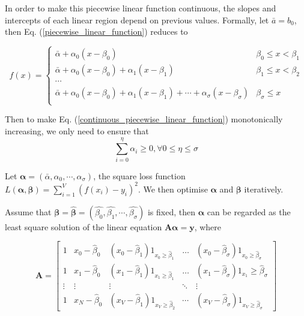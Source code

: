 In order to make this piecewise linear function continuous, the slopes and intercepts of each linear region depend on previous values. Formally, let $\bar{a}=b_0$, then Eq. (\ref{piecewise_linear_function}) reduces to

\begin{equation}
	\label{continuous_piecewise_linear_function}
	f(x)= \begin{cases} 
      \bar{\alpha}+\alpha_0(x-\beta_0) & \beta_0\leq x < \beta_1 \\
      \bar{\alpha}+\alpha_0(x-\beta_0) + \alpha_1(x-\beta_1) &  \beta_1\leq x < \beta_2 \\
      \cdots \\
      \bar{\alpha}+\alpha_0(x-\beta_0) + \alpha_1(x-\beta_1)+\cdots+\alpha_\sigma(x-\beta_\sigma) &  \beta_\sigma\leq x \\
   \end{cases}
\end{equation}


Then to make Eq. (\ref{continuous_piecewise_linear_function}) monotonically increasing, we only need to ensure that $$\sum_{i=0}^\eta \alpha_i\geq 0, \forall 0\leq \eta\leq \sigma$$

Let $\boldsymbol{\alpha}=(\bar{\alpha},\alpha_0,\cdots,\alpha_\sigma)$, the square loss function $L(\boldsymbol{\alpha},\boldsymbol{\beta})=\sum_{i=1}^{V}(f(x_i)-y_i)^2$. We then optimise $\boldsymbol{\alpha}$ and $\boldsymbol{\beta}$ iteratively.

Assume that $\boldsymbol{\beta}=\hat{\boldsymbol{\beta}}=(\hat{\beta_0},\hat{\beta_1},\cdots,\hat{\beta_\sigma})$ is fixed, then $\boldsymbol{\alpha}$ can be regarded as the least square solution of the linear equation $\boldsymbol{A\alpha}=\boldsymbol{y}$, where

$$
\boldsymbol{A}=\left[\begin{array}{ccccc}
1 & x_{0}-\hat{\beta}_{0} & \left(x_{0}-\hat{\beta}_{1}\right) 1_{x_{0} \geq \hat{\beta}_{1}} & \ldots & \left(x_{0}-\hat{\beta}_{\sigma}\right) 1_{x_{0} \geq \hat{\beta}_{\sigma}} \\
1 & x_{1}-\hat{\beta}_{0} & \left(x_{1}-\hat{\beta}_{1}\right) 1_{x_{1} \geq \hat{\beta}_{1}} & \ldots & \left(x_{1}-\hat{\beta}_{\sigma}\right) 1_{x_{1}} \geq \hat{\beta}_{\sigma} \\
\vdots & \vdots & \vdots & \ddots & \vdots \\
1 & x_{N}-\hat{\beta}_{0} & \left(x_{V}-\hat{\beta}_{1}\right) 1_{x_{V} \geq \hat{\beta}_{2}} & \cdots & \left(x_{V}-\hat{\beta}_{\sigma}\right) 1_{x_{V} \geq \hat{\beta}_{\sigma}}
\end{array}\right]$$

